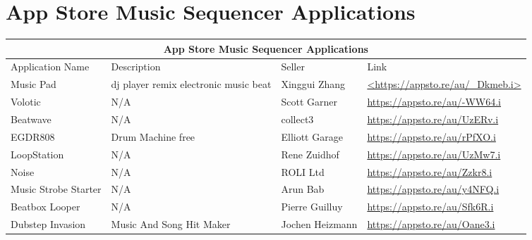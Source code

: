 \chapter{App Store Music Sequencer Applications}

\begin{tabular}{ |p{3cm}||p{3.5cm}|p{3.5cm}|p{3.5cm}||}
 \hline
 \multicolumn{4}{|c|}{App Store Music Sequencer Applications} \\
 \hline
 Application Name   & Description  & Seller & Link\\
 \hline
 Music Pad  & dj player remix electronic music beat & Xinggui Zhang & \url{<https://appsto.re/au/_Dkmeb.i>}\\

 Volotic & N/A & Scott Garner &
\url{ https://appsto.re/au/-WW64.i}\\

 Beatwave & N/A & collect3 &
 \url{https://appsto.re/au/UzERv.i}\\

 EGDR808 & Drum Machine free & Elliott Garage &
 \url{https://appsto.re/au/rPfXO.i}\\

 LoopStation & N/A & Rene Zuidhof &
 \url{https://appsto.re/au/UzMw7.i}\\

 Noise & N/A & ROLI Ltd &
 \url{https://appsto.re/au/Zzkr8.i}\\

 Music Strobe Starter & N/A & Arun Bab&
 \url{https://appsto.re/au/y4NFQ.i}\\

 Beatbox Looper & N/A & Pierre Guilluy&
 \url{https://appsto.re/au/Sfk6R.i}\\

 Dubstep Invasion & Music And Song Hit Maker & Jochen Heizmann&
 \url{https://appsto.re/au/Oane3.i}\\



 \hline
\end{tabular}
\fancyfoot[C]{\thepage}

\newpage
\pagestyle{fancy}
\fancyfoot{}
\fancyfoot[C]{\thepage}

